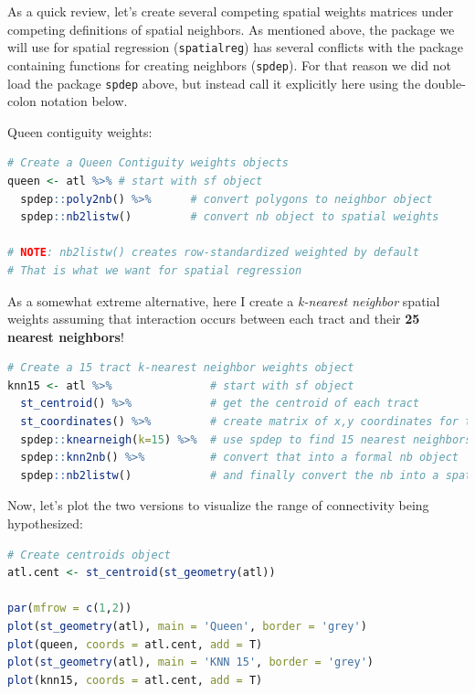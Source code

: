 \documentclass[
]{book}
\newcommand{\passthrough}[1]{#1}
\begin{document}
As a quick review, let's create several competing spatial weights matrices under competing definitions of spatial neighbors. As mentioned above, the package we will use for spatial regression (\passthrough{\lstinline!spatialreg!}) has several conflicts with the package containing functions for creating neighbors (\passthrough{\lstinline!spdep!}). For that reason we did not load the package \passthrough{\lstinline!spdep!} above, but instead call it explicitly here using the double-colon notation below.

Queen contiguity weights:

\begin{lstlisting}[language=R]
# Create a Queen Contiguity weights objects
queen <- atl %>% # start with sf object
  spdep::poly2nb() %>%      # convert polygons to neighbor object
  spdep::nb2listw()         # convert nb object to spatial weights

# NOTE: nb2listw() creates row-standardized weighted by default
# That is what we want for spatial regression
\end{lstlisting}

As a somewhat extreme alternative, here I create a \emph{k-nearest neighbor} spatial weights assuming that interaction occurs between each tract and their \textbf{25 nearest neighbors}!

\begin{lstlisting}[language=R]
# Create a 15 tract k-nearest neighbor weights object
knn15 <- atl %>%               # start with sf object
  st_centroid() %>%            # get the centroid of each tract
  st_coordinates() %>%         # create matrix of x,y coordinates for that centroid
  spdep::knearneigh(k=15) %>%  # use spdep to find 15 nearest neighbors
  spdep::knn2nb() %>%          # convert that into a formal nb object
  spdep::nb2listw()            # and finally convert the nb into a spatial weights object
\end{lstlisting}

Now, let's plot the two versions to visualize the range of connectivity being hypothesized:

\begin{lstlisting}[language=R]
# Create centroids object
atl.cent <- st_centroid(st_geometry(atl))

par(mfrow = c(1,2))
plot(st_geometry(atl), main = 'Queen', border = 'grey')
plot(queen, coords = atl.cent, add = T)
plot(st_geometry(atl), main = 'KNN 15', border = 'grey')
plot(knn15, coords = atl.cent, add = T)
\end{lstlisting}
\end{document}

